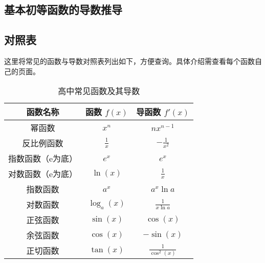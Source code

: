 \subsection{基本初等函数的导数推导}

\subsection{对照表}

这里将常见的函数与导数对照表列出如下，方便查询。具体介绍需查看每个函数自己的页面。

\begin{table}[ht]
\centering
\caption{高中常见函数及其导数}\label{tab_HsDerv1}
\begin{tabular}{|c|c|c|}
\hline
\textbf{函数名称}     & \textbf{函数 $f(x)$}     & \textbf{导函数 $f'(x)$}     \\ \hline
幂函数&$x^n$                    & $n x^{n-1}$                \\ \hline
反比例函数&$\displaystyle\frac{1}{x}$             & $\displaystyle-\frac{1}{x^2}$           \\ \hline
指数函数（e为底）&$e^x$                     & $e^x$                      \\ \hline
对数函数（e为底）&$\ln(x)$                  & $\displaystyle\frac{1}{x}$              \\ \hline
指数函数&$a^x$                     & $a^x\ln a $                      \\ \hline
对数函数&$\log_a(x)$                  & $\displaystyle \frac{1}{x\ln a}$              \\ \hline
正弦函数&$\sin(x)$                 & $\cos(x)$                  \\ \hline
余弦函数&$\cos(x)$                 & $-\sin(x)$                 \\ \hline
正切函数&$\tan(x)$                 & $\displaystyle \frac{1}{\cos^2(x)}$                \\ \hline
\end{tabular}
\end{table}

